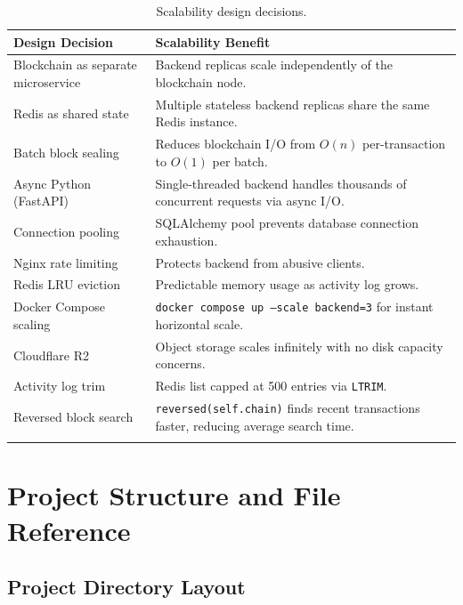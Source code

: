 \documentclass[12pt, a4paper]{report}
\begin{document}
\begin{longtable}{p{5cm} p{9cm}}
\toprule
\textbf{Design Decision} & \textbf{Scalability Benefit} \\
\midrule
\endhead
Blockchain as separate microservice & Backend replicas scale independently of
    the blockchain node. \\
\midrule
Redis as shared state & Multiple stateless backend replicas share the same
    Redis instance. \\
\midrule
Batch block sealing & Reduces blockchain I/O from $O(n)$ per-transaction to
    $O(1)$ per batch. \\
\midrule
Async Python (FastAPI) & Single-threaded backend handles thousands of
    concurrent requests via async I/O. \\
\midrule
Connection pooling & SQLAlchemy pool prevents database connection exhaustion. \\
\midrule
Nginx rate limiting & Protects backend from abusive clients. \\
\midrule
Redis LRU eviction & Predictable memory usage as activity log grows. \\
\midrule
Docker Compose scaling & \texttt{docker compose up --scale backend=3}
    for instant horizontal scale. \\
\midrule
Cloudflare R2 & Object storage scales infinitely with no disk capacity
    concerns. \\
\midrule
Activity log trim & Redis list capped at 500 entries via \texttt{LTRIM}. \\
\midrule
Reversed block search & \texttt{reversed(self.chain)} finds recent
    transactions faster, reducing average search time. \\
\bottomrule
\caption{Scalability design decisions.}
\end{longtable}


\chapter{Project Structure and File Reference}

\section{Project Directory Layout}
\end{document}
